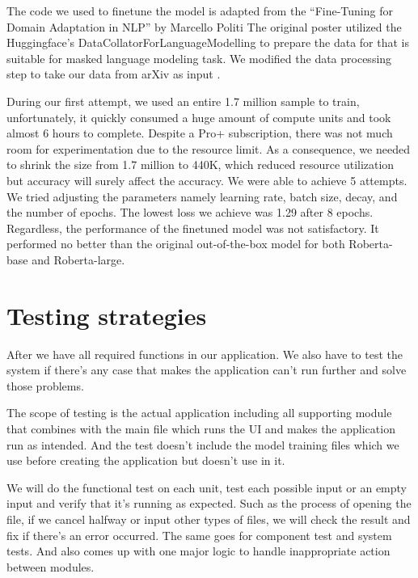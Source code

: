 \documentclass[12pt,oneside,openright,a4paper]{cpe-english-project}
\begin{document}
The code we used to finetune the model is adapted from the “Fine-Tuning for Domain Adaptation in NLP” by Marcello Politi \cite{s}
The original poster utilized the Huggingface’s DataCollatorForLanguageModelling to prepare the data for that is suitable for masked language modeling task. We modified the data processing step to take our data from arXiv as input \cite{t}. 
 
During our first attempt, we used an entire 1.7 million sample to train, unfortunately, it quickly consumed a huge amount of compute units and took almost 6 hours to complete. Despite a Pro+ subscription, there was not much room for experimentation due to the resource limit. As a consequence, we needed to shrink the size from 1.7 million to 440K, which reduced resource utilization but accuracy will surely affect the accuracy. We were able to achieve 5 attempts. We tried adjusting the parameters namely learning rate, batch size, decay, and the number of epochs. The lowest loss we achieve was 1.29 after 8 epochs. Regardless, the performance of the finetuned model was not satisfactory. It performed no better than the original out-of-the-box model for both Roberta-base and Roberta-large.


\section{Testing strategies}
After we have all required functions in our application. We also have to test the system if there’s any case that makes the application can’t run further and solve those problems.

The scope of testing is the actual application including all supporting module that combines with the main file which runs the UI and makes the application run as intended. And the test doesn’t include the model training files which we use before creating the application but doesn’t use in it.

We will do the functional test on each unit, test each possible input or an empty input and verify that it’s running as expected. Such as the process of opening the file, if we cancel halfway or input other types of files, we will check the result and fix if there’s an error occurred. The same goes for component test and system tests. And also comes up with one major logic to handle inappropriate action between modules.
\end{document}
